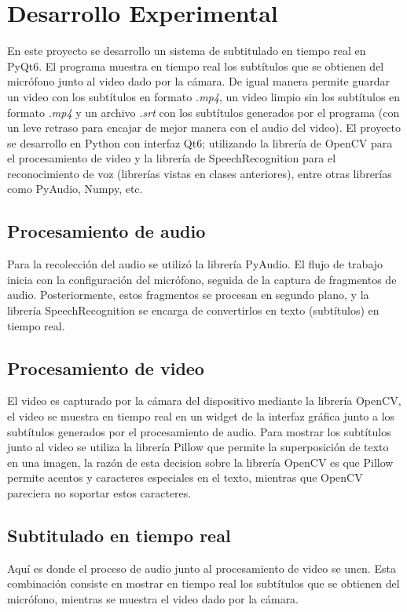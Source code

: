 \documentclass[conference]{IEEEtran}
\begin{document}
\section{Desarrollo Experimental}
En este proyecto se desarrollo un sistema de subtitulado en tiempo real en PyQt6. El programa muestra en tiempo real los subtítulos que se obtienen del micrófono junto al video dado por la cámara. De igual manera permite guardar un video con los subtítulos en formato \textit{.mp4}, un video limpio sin los subtítulos en formato \textit{.mp4} y un archivo \textit{.srt} con los subtítulos generados por el programa (con un leve retraso para encajar de mejor manera con el audio del video). El proyecto se desarrollo en Python con interfaz Qt6; utilizando la librería de OpenCV para el procesamiento de video y la librería de SpeechRecognition para el reconocimiento de voz (librerías vistas en clases anteriores), entre otras librerías como PyAudio, Numpy, etc.

\subsection{Procesamiento de audio}
Para la recolección del audio se utilizó la librería PyAudio. El flujo de trabajo inicia con la configuración del micrófono, seguida de la captura de fragmentos de audio. Posteriormente, estos fragmentos se procesan en segundo plano, y la librería SpeechRecognition se encarga de convertirlos en texto (subtítulos) en tiempo real.

\subsection{Procesamiento de video}
El video es capturado por la cámara del dispositivo mediante la librería OpenCV, el video se muestra en tiempo real en un widget de la interfaz gráfica junto a los subtítulos generados por el procesamiento de audio. Para mostrar los subtítulos junto al video se utiliza la librería Pillow que permite la superposición de texto en una imagen, la razón de esta decision sobre la librería OpenCV es que Pillow permite acentos y caracteres especiales en el texto, mientras que OpenCV pareciera no soportar estos caracteres.

\subsection{Subtitulado en tiempo real}
Aquí es donde el proceso de audio junto al procesamiento de video se unen. Esta combinación consiste en mostrar en tiempo real los subtítulos que se obtienen del micrófono, mientras se muestra el video dado por la cámara.
\end{document}
